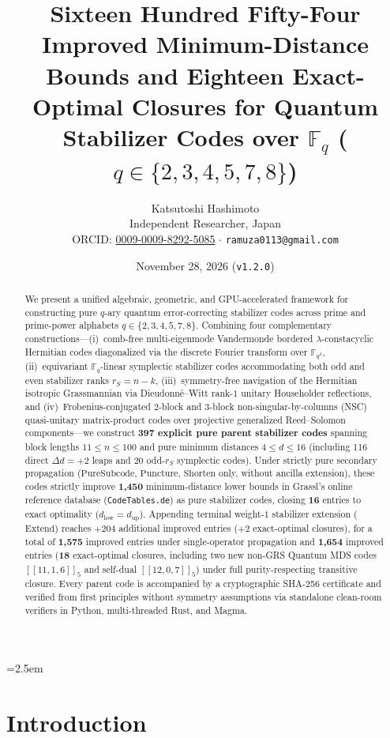 \documentclass[11pt,a4paper]{article}
\title{\textbf{Sixteen Hundred Fifty-Four Improved Minimum-Distance Bounds and Eighteen Exact-Optimal Closures for Quantum Stabilizer Codes over \texorpdfstring{$\mathbb{F}_q$ ($q \in \{2, 3, 4, 5, 7, 8\}$)}{GF(q) (q in 2, 3, 4, 5, 7, 8)}}}
\author{Katsutoshi Hashimoto\\
\small Independent Researcher, Japan\\
\small ORCID: \href{https://orcid.org/0009-0009-8292-5085}{0009-0009-8292-5085} \quad $\cdot$ \quad \texttt{ramuza0113@gmail.com}}
\date{November 28, 2026 \quad (\texttt{v1.2.0})}
\theoremstyle{remark}
\begin{document}
\emergencystretch=2.5em
\maketitle

\begin{abstract}
We present a unified algebraic, geometric, and GPU-accelerated framework for constructing pure $q$-ary quantum error-correcting stabilizer codes across prime and prime-power alphabets $q \in \{2, 3, 4, 5, 7, 8\}$. Combining four complementary constructions---(i)~comb-free multi-eigenmode Vandermonde bordered $\lambda$-constacyclic Hermitian codes diagonalized via the discrete Fourier transform over $\mathbb{F}_{q^2}$, (ii)~equivariant $\mathbb{F}_q$-linear symplectic stabilizer codes accommodating both odd and even stabilizer ranks $r_S = n - k$, (iii)~symmetry-free navigation of the Hermitian isotropic Grassmannian via Dieudonn\'e--Witt rank-$1$ unitary Householder reflections, and (iv)~Frobenius-conjugated $2$-block and $3$-block non-singular-by-columns (NSC) quasi-unitary matrix-product codes over projective generalized Reed--Solomon components---we construct \textbf{397 explicit pure parent stabilizer codes} spanning block lengths $11 \le n \le 100$ and pure minimum distances $4 \le d \le 16$ (including 116 direct $\Delta d = +2$ leaps and 20 odd-$r_S$ symplectic codes). Under strictly pure secondary propagation ($\mathrm{PureSubcode}$, $\mathrm{Puncture}$, $\mathrm{Shorten}$ only, without ancilla extension), these codes strictly improve \textbf{1,450} minimum-distance lower bounds in Grassl's online reference database (\texttt{CodeTables.de}) as pure stabilizer codes, closing \textbf{16} entries to exact optimality ($d_{\mathrm{low}} = d_{\mathrm{up}}$). Appending terminal weight-$1$ stabilizer extension ($\mathrm{Extend}$) reaches $+204$ additional improved entries ($+2$ exact-optimal closures), for a total of \textbf{1,575} improved entries under single-operator propagation and \textbf{1,654} improved entries (\textbf{18} exact-optimal closures, including two new non-GRS Quantum MDS codes $[[11,1,6]]_5$ and self-dual $[[12,0,7]]_5$) under full purity-respecting transitive closure. Every parent code is accompanied by a cryptographic SHA-256 certificate and verified from first principles without symmetry assumptions via standalone clean-room verifiers in Python, multi-threaded Rust, and Magma.
\end{abstract}

\section{Introduction}
\end{document}

